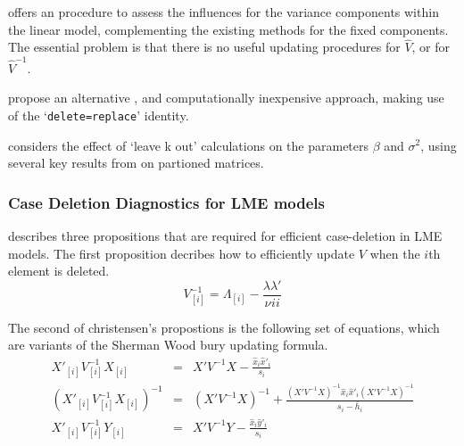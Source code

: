 \documentclass[12pt, a4paper]{report}
\theoremstyle{plain}
\theoremstyle{definition}
\theoremstyle{remark}
\begin{document}
	
	\citet{HaslettDillane} offers an
	procedure to assess the influences for the variance components
	within the linear model, complementing the existing methods for the fixed components. The essential problem is that there is no useful updating procedures for $\hat{V}$, or for $\hat{V}^{-1}$.
		
		
	\citet{HaslettDillane} propose an alternative , and
	computationally inexpensive approach, making use of the
	`\texttt{delete=replace}' identity.
	
	\citet{Haslett99} considers the effect of `leave k out'
	calculations on the parameters $\beta$ and $\sigma^{2}$, using
	several key results from \citet{HaslettHayes} on partioned
	matrices.
	
	
	
	
	
	
	
	
	


	\subsubsection{Case Deletion Diagnostics for LME models}
	

	
	\citet{Christensen} describes three propositions that are required
	for efficient case-deletion in LME models. The first proposition
	decribes how to efficiently update $V$ when the $i$th element is
	deleted.
	\begin{equation}
	V_{[i]}^{-1} = \Lambda_{[i]} - \frac{\lambda
		\lambda\prime}{\nu^{}ii}
	\end{equation}
	
	The second of christensen's propostions is the following set of
	equations, which are variants of the Sherman Wood bury updating
	formula.
	\begin{eqnarray}
	X'_{[i]}V_{[i]}^{-1}X_{[i]} &=& X' V^{-1}X -
	\frac{\hat{x}_{i}\hat{x}'_{i}}{s_{i}}\\
	(X'_{[i]}V_{[i]}^{-1}X_{[i]})^{-1} &=& (X' V^{-1}X)^{-1} +
	\frac{(X' V^{-1}X)^{-1}\hat{x}_{i}\hat{x}' _{i}
		(X' V^{-1}X)^{-1}}{s_{i}- \bar{h}_{i}}\\
	X'_{[i]}V_{[i]}^{-1}Y_{[i]} &=& X\prime V^{-1}Y -
	\frac{\hat{x}_{i}\hat{y}' _{i}}{s_{i}}
	\end{eqnarray}
	
\end{document}
